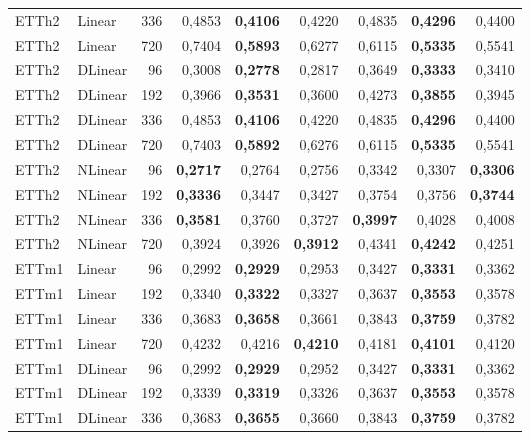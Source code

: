 \begin{longtable}{@{}llr rrr rrr@{}}
ETTh2 & Linear & 336 & 0{,}4853 & \textbf{0{,}4106} & 0{,}4220 & 0{,}4835 & \textbf{0{,}4296} & 0{,}4400 \\
ETTh2 & Linear & 720 & 0{,}7404 & \textbf{0{,}5893} & 0{,}6277 & 0{,}6115 & \textbf{0{,}5335} & 0{,}5541 \\
\addlinespace[2pt]
ETTh2 & DLinear & 96 & 0{,}3008 & \textbf{0{,}2778} & 0{,}2817 & 0{,}3649 & \textbf{0{,}3333} & 0{,}3410 \\
ETTh2 & DLinear & 192 & 0{,}3966 & \textbf{0{,}3531} & 0{,}3600 & 0{,}4273 & \textbf{0{,}3855} & 0{,}3945 \\
ETTh2 & DLinear & 336 & 0{,}4853 & \textbf{0{,}4106} & 0{,}4220 & 0{,}4835 & \textbf{0{,}4296} & 0{,}4400 \\
ETTh2 & DLinear & 720 & 0{,}7403 & \textbf{0{,}5892} & 0{,}6276 & 0{,}6115 & \textbf{0{,}5335} & 0{,}5541 \\
\addlinespace[2pt]
ETTh2 & NLinear & 96 & \textbf{0{,}2717} & 0{,}2764 & 0{,}2756 & 0{,}3342 & 0{,}3307 & \textbf{0{,}3306} \\
ETTh2 & NLinear & 192 & \textbf{0{,}3336} & 0{,}3447 & 0{,}3427 & 0{,}3754 & 0{,}3756 & \textbf{0{,}3744} \\
ETTh2 & NLinear & 336 & \textbf{0{,}3581} & 0{,}3760 & 0{,}3727 & \textbf{0{,}3997} & 0{,}4028 & 0{,}4008 \\
ETTh2 & NLinear & 720 & 0{,}3924 & 0{,}3926 & \textbf{0{,}3912} & 0{,}4341 & \textbf{0{,}4242} & 0{,}4251 \\
\addlinespace[2pt]
\midrule
ETTm1 & Linear & 96 & 0{,}2992 & \textbf{0{,}2929} & 0{,}2953 & 0{,}3427 & \textbf{0{,}3331} & 0{,}3362 \\
ETTm1 & Linear & 192 & 0{,}3340 & \textbf{0{,}3322} & 0{,}3327 & 0{,}3637 & \textbf{0{,}3553} & 0{,}3578 \\
ETTm1 & Linear & 336 & 0{,}3683 & \textbf{0{,}3658} & 0{,}3661 & 0{,}3843 & \textbf{0{,}3759} & 0{,}3782 \\
ETTm1 & Linear & 720 & 0{,}4232 & 0{,}4216 & \textbf{0{,}4210} & 0{,}4181 & \textbf{0{,}4101} & 0{,}4120 \\
\addlinespace[2pt]
ETTm1 & DLinear & 96 & 0{,}2992 & \textbf{0{,}2929} & 0{,}2952 & 0{,}3427 & \textbf{0{,}3331} & 0{,}3362 \\
ETTm1 & DLinear & 192 & 0{,}3339 & \textbf{0{,}3319} & 0{,}3326 & 0{,}3637 & \textbf{0{,}3553} & 0{,}3578 \\
ETTm1 & DLinear & 336 & 0{,}3683 & \textbf{0{,}3655} & 0{,}3660 & 0{,}3843 & \textbf{0{,}3759} & 0{,}3782 \\

\end{longtable}
